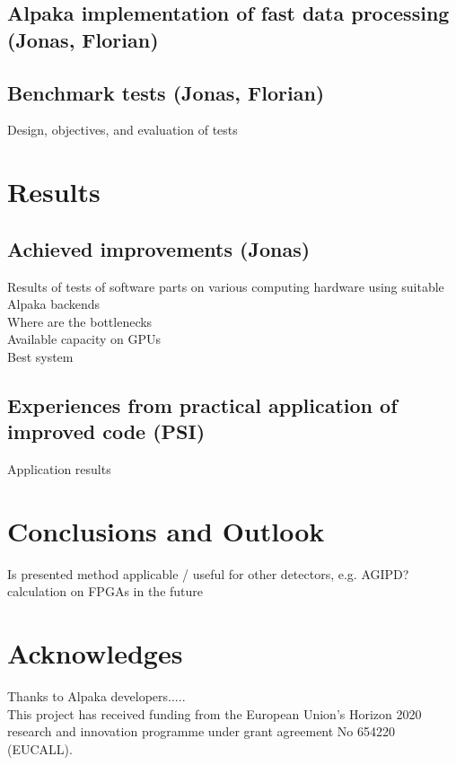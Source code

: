 \documentclass[a4paper]{article}
\begin{document}
\subsection{Alpaka implementation of fast data processing (Jonas, Florian)}


\subsection{Benchmark tests (Jonas, Florian)}
Design, objectives, and evaluation of tests

\section{Results}
\subsection{Achieved improvements (Jonas)}
Results of tests of software parts on various computing hardware using suitable Alpaka backends\\

Where are the bottlenecks\\

Available capacity on GPUs\\

Best system

\subsection{Experiences from practical application of improved code (PSI)}
Application results

\section{Conclusions and Outlook}

Is presented method applicable / useful for other detectors, e.g. AGIPD? \\

calculation on FPGAs in the future


\section{Acknowledges}
Thanks to Alpaka developers.....\\

This project has received funding from the European Union's Horizon 2020 research and innovation programme under grant agreement No 654220 (EUCALL).

\newpage

\begin{sloppypar}
\printbibliography
\end{sloppypar}
\end{document}
